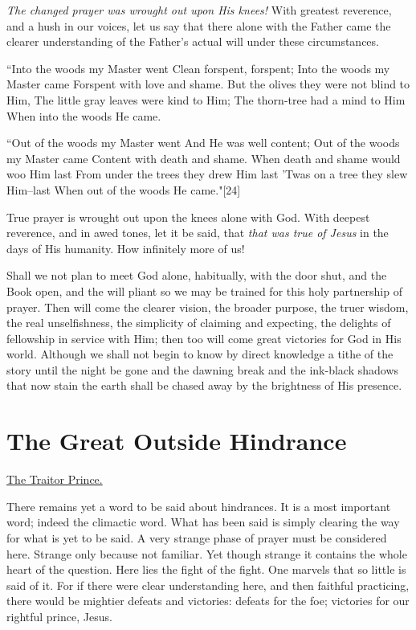 \textit{The changed prayer was wrought out upon His knees!} With greatest
reverence, and a hush in our voices, let us say that there alone with the
Father came the clearer understanding of the Father's actual will under
these circumstances.

    ``Into the woods my Master went
    Clean forspent, forspent;
    Into the woods my Master came
    Forspent with love and shame.
    But the olives they were not blind to Him,
    The little gray leaves were kind to Him;
    The thorn-tree had a mind to Him
    When into the woods He came.

    ``Out of the woods my Master went
    And He was well content;
    Out of the woods my Master came
    Content with death and shame.
    When death and shame would woo Him last
    From under the trees they drew Him last
    'Twas on a tree they slew Him--last
    When out of the woods He came."[24]

True prayer is wrought out upon the knees alone with God. With deepest
reverence, and in awed tones, let it be said, that \textit{that was true of
Jesus} in the days of His humanity. How infinitely more of us!

Shall we not plan to meet God alone, habitually, with the door shut, and
the Book open, and the will pliant so we may be trained for this holy
partnership of prayer. Then will come the clearer vision, the broader
purpose, the truer wisdom, the real unselfishness, the simplicity of
claiming and expecting, the delights of fellowship in service with Him;
then too will come great victories for God in His world. Although we
shall not begin to know by direct knowledge a tithe of the story until the
night be gone and the dawning break and the ink-black shadows that now
stain the earth shall be chased away by the brightness of His presence.




\chapter{The Great Outside Hindrance}



\underline{The Traitor Prince.}


There remains yet a word to be said about hindrances. It is a most
important word; indeed the climactic word. What has been said is simply
clearing the way for what is yet to be said. A very strange phase of
prayer must be considered here. Strange only because not familiar. Yet
though strange it contains the whole heart of the question. Here lies the
fight of the fight. One marvels that so little is said of it. For if there
were clear understanding here, and then faithful practicing, there would
be mightier defeats and victories: defeats for the foe; victories for our
rightful prince, Jesus.

